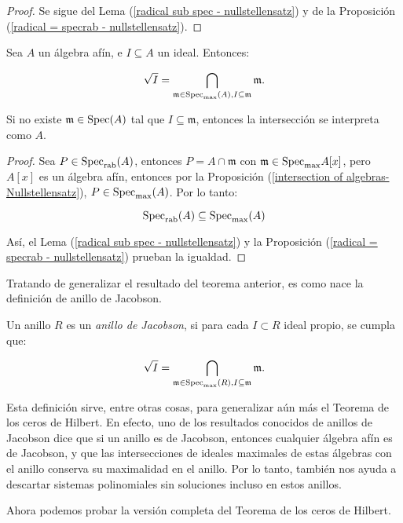 \begin{proof}
Se sigue del Lema (\ref{radical sub spec - nullstellensatz}) y de la Proposición (\ref{radical = specrab - nullstellensatz}).
\end{proof}

\begin{theorem} \label{algebras radical = specmax - nullstellensatz}
Sea $A$ un álgebra afín, e $I \subseteq A$ un ideal. Entonces:

$$\sqrt{I} = \bigcap_{\mathfrak{m} \in \textrm{Spec}_{\textrm{max}}(A), I \subseteq \mathfrak{m}} \mathfrak{m}.$$

Si no existe $\mathfrak{m} \in \textrm{Spec}(A)$ tal que $I \subseteq \mathfrak{m}$, entonces la intersección se interpreta como $A$.
\end{theorem}

\begin{proof}
Sea $P \in \textrm{Spec}_{\textrm{rab}}(A)$, entonces $P = A \cap \mathfrak{m}$ con $\mathfrak{m} \in \textrm{Spec}_{\textrm{max}}{A[x]}$, pero $A[x]$ es un álgebra afín, entonces por la Proposición (\ref{intersection of algebras-Nullstellensatz}), $P \in \textrm{Spec}_{\textrm{max}}(A)$. Por lo tanto:

$$ \textrm{Spec}_{\textrm{rab}}(A) \subseteq \textrm{Spec}_{\textrm{max}}(A)$$

Así, el Lema (\ref{radical sub spec - nullstellensatz}) y la Proposición (\ref{radical = specrab - nullstellensatz}) prueban la igualdad.
\end{proof}

Tratando de generalizar el resultado del teorema anterior, es como nace la definición de anillo de Jacobson.

\begin{definition}
Un anillo $R$ es un \emph{anillo de Jacobson}, si para cada $I \subset R$ ideal propio, se cumpla que:

$$\sqrt{I} = \bigcap_{\mathfrak{m} \in \textrm{Spec}_{\textrm{max}}(R), I \subseteq \mathfrak{m}} \mathfrak{m}.$$

\end{definition}

Esta definición sirve, entre otras cosas, para generalizar aún más el Teorema de los ceros de Hilbert. En efecto, uno de los resultados conocidos de anillos de Jacobson dice que si un anillo es de Jacobson, entonces cualquier álgebra afín es de Jacobson, y que las intersecciones de ideales maximales de estas álgebras con el anillo conserva su maximalidad en el anillo. Por lo tanto, también nos ayuda a descartar sistemas polinomiales sin soluciones incluso en estos anillos.

Ahora podemos probar la versión completa del Teorema de los ceros de Hilbert.

